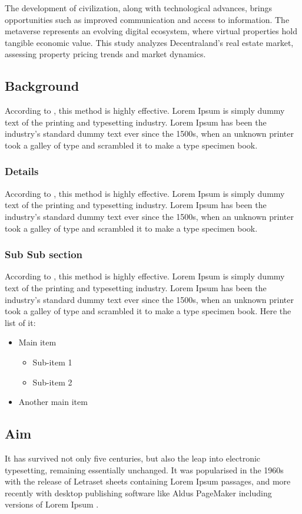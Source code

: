 \documentclass[a4paper]{article}
\begin{document}
\begin{multicols}{2}
The development of civilization, along with technological advances, brings opportunities such as improved communication and access to information. The metaverse represents an evolving digital ecosystem, where virtual properties hold tangible economic value. This study analyzes Decentraland’s real estate market, assessing property pricing trends and market dynamics.

\subsection{Background}
According to \cite{1}, this method is highly effective. Lorem Ipsum is simply dummy text of the printing and typesetting industry. Lorem Ipsum has been the industry's standard dummy text ever since the 1500s, when an unknown printer took a galley of type and scrambled it to make a type specimen book. 

\subsubsection{Details}
According to \cite{1}, this method is highly effective. Lorem Ipsum is simply dummy text of the printing and typesetting industry. Lorem Ipsum has been the industry's standard dummy text ever since the 1500s, when an unknown printer took a galley of type and scrambled it to make a type specimen book. 

\subsubsection{Sub Sub section}
According to \cite{1}, this method is highly effective. Lorem Ipsum is simply dummy text of the printing and typesetting industry. Lorem Ipsum has been the industry's standard dummy text ever since the 1500s, when an unknown printer took a galley of type and scrambled it to make a type specimen book. Here the list of it:

\begin{itemize}
    \item Main item
    \begin{itemize}
        \item Sub-item 1
        \item Sub-item 2
    \end{itemize}
    \item Another main item
\end{itemize}


\subsection{Aim}
It has survived not only five centuries, but also the leap into electronic typesetting, remaining essentially unchanged. It was popularised in the 1960s with the release of Letraset sheets containing Lorem Ipsum passages, and more recently with desktop publishing software like Aldus PageMaker including versions of Lorem Ipsum \cite{1,2,3,4}.


\end{multicols}
\end{document}
